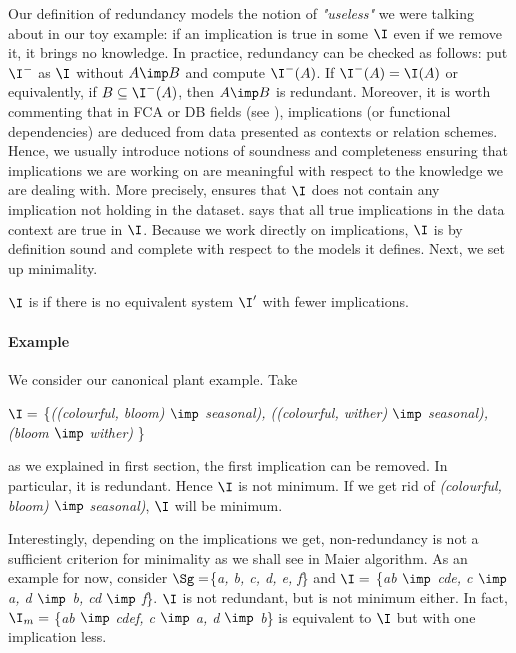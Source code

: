 \noindent Our definition of redundancy models the notion of \textit{"useless"} 
we were talking about in our toy example: if an implication is true in some 
$\I$ even if we remove it, it brings no knowledge. In practice, redundancy can 
be checked as follows: put $\I^{-}$ as
$\I$ without $A \imp B$ and compute $\I^{-}(A)$. If $\I^{-}(A) = \I(A)$ or 
equivalently, if $B \subseteq \I^{-}(A)$, then $A \imp B$ is redundant. 
Moreover, it is worth commenting that in FCA or DB fields (see 
\cite{ganter_formal_1999, maier_theory_1983}), implications (or 
functional dependencies) are deduced from data presented as contexts or relation schemes. Hence, 
we usually introduce notions of soundness and completeness ensuring that 
implications we are working on are meaningful with respect to the knowledge we 
are dealing with. More precisely,  ensures that $\I$ does not 
contain any implication not holding in the dataset. 
says that all true implications in the data context are true in $\I$. Because 
we work directly on implications, $\I$ is by definition sound and complete with 
respect to the models it defines. Next, we set up minimality.

\begin{definition}[Minimality] $\I$ is  if there is no 
equivalent system $\I'$ with fewer implications.
\end{definition}

\paragraph{Example} We consider our canonical plant example. Take 

\begin{center}
	$\I = $  \{\textit{((colourful, bloom) $\imp$ seasonal), ((colourful, 
		wither) $\imp$ seasonal), (bloom $\imp$ wither)} \}
\end{center}

\noindent as we explained in first section, the first implication can be 
removed. In particular, it is redundant. Hence $\I$ is not minimum. If 
we get rid of \textit{(colourful, bloom) $\imp$ seasonal)}, $\I$ 
will be minimum.

\vspace{1.2em}

Interestingly, depending on the implications we get, non-redundancy is not a 
sufficient criterion for minimality as we shall see in Maier algorithm. As an 
example for now, consider $\Sg = $\{\textit{a, b, c, d, e, f}\} and $\I = $ 
\{\textit{ab $\imp$ cde, c $\imp$ a, d $\imp$ b, cd $\imp$ f}\}. $\I$ is not 
redundant, but is not minimum either. In fact, $\I_m = $ \{\textit{ab $\imp$ 
cdef, c $\imp$ a, d $\imp$ b}\} is equivalent to $\I$ but with one implication 
less. 

